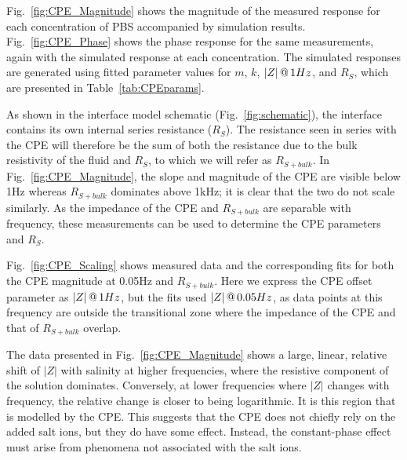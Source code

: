 \documentclass[journal, a4paper]{IEEEtran}
\begin{document}
Fig.~\ref{fig:CPE_Magnitude} shows the magnitude of the measured response for each concentration of PBS accompanied by simulation results. Fig.~\ref{fig:CPE_Phase} shows the phase response for the same measurements, again with the simulated response at each concentration. The simulated responses are generated using fitted parameter values for $m$, $k$, $|Z|\thinspace @\thinspace 1Hz$, and $R_S$, which are presented in Table~\ref{tab:CPEparams}.

As shown in the interface model schematic (Fig.~\ref{fig:schematic}), the interface contains its own internal series resistance ($R_{S}$). The resistance seen in series with the CPE will therefore be the sum of both the resistance due to the bulk resistivity of the fluid and $R_{S}$, to which we will refer as $R_{S+bulk}$.
In Fig.~\ref{fig:CPE_Magnitude}, the slope and magnitude of the CPE are visible below 1\thinspace Hz whereas $R_{S+bulk}$  dominates above 1\thinspace kHz; it is clear that the two do not scale similarly.
As the impedance of the CPE and $R_{S+bulk}$ are separable with frequency, these measurements can be used to determine the CPE parameters and $R_{S}$.

Fig.~\ref{fig:CPE_Scaling} shows measured data and the corresponding fits for both the CPE magnitude at 0.05\thinspace Hz and $R_{S+bulk}$. Here we express the CPE offset parameter as $|Z|\thinspace @ \thinspace 1Hz$, but the fits used $|Z|\thinspace @ \thinspace 0.05Hz$, as data points at this frequency are outside the transitional zone where the impedance of the CPE and that of $R_{S+bulk}$ overlap.

The data presented in Fig.~\ref{fig:CPE_Magnitude} shows a large, linear, relative shift of $|Z|$ with salinity at higher frequencies, where the resistive component of the solution dominates.
Conversely, at lower frequencies where $|Z|$ changes with frequency, the relative change is closer to being logarithmic. It is this region that is modelled by the CPE.
This suggests that the CPE does not chiefly rely on the added salt ions, but they do have some effect.
Instead, the constant-phase effect must arise from phenomena not associated with the salt ions.
\end{document}
